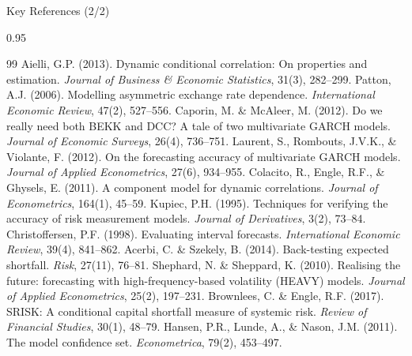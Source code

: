 \documentclass[9pt, aspectratio=169, t]{beamer}
\begin{document}
\begin{frame}{Key References (2/2)}
    \begin{cminipage}{0.95\textwidth}
    \vspace{-3mm}
    {\tiny
    \begin{thebibliography}{99}\setlength{\itemsep}{0pt}
         Aielli, G.P. (2013). Dynamic conditional correlation: On properties and estimation. \textit{Journal of Business \& Economic Statistics}, 31(3), 282--299.
         Patton, A.J. (2006). Modelling asymmetric exchange rate dependence. \textit{International Economic Review}, 47(2), 527--556.
         Caporin, M. \& McAleer, M. (2012). Do we really need both BEKK and DCC? A tale of two multivariate GARCH models. \textit{Journal of Economic Surveys}, 26(4), 736--751.
         Laurent, S., Rombouts, J.V.K., \& Violante, F. (2012). On the forecasting accuracy of multivariate GARCH models. \textit{Journal of Applied Econometrics}, 27(6), 934--955.
         Colacito, R., Engle, R.F., \& Ghysels, E. (2011). A component model for dynamic correlations. \textit{Journal of Econometrics}, 164(1), 45--59.
         Kupiec, P.H. (1995). Techniques for verifying the accuracy of risk measurement models. \textit{Journal of Derivatives}, 3(2), 73--84.
         Christoffersen, P.F. (1998). Evaluating interval forecasts. \textit{International Economic Review}, 39(4), 841--862.
         Acerbi, C. \& Szekely, B. (2014). Back-testing expected shortfall. \textit{Risk}, 27(11), 76--81.
         Shephard, N. \& Sheppard, K. (2010). Realising the future: forecasting with high-frequency-based volatility (HEAVY) models. \textit{Journal of Applied Econometrics}, 25(2), 197--231.
         Brownlees, C. \& Engle, R.F. (2017). SRISK: A conditional capital shortfall measure of systemic risk. \textit{Review of Financial Studies}, 30(1), 48--79.
         Hansen, P.R., Lunde, A., \& Nason, J.M. (2011). The model confidence set. \textit{Econometrica}, 79(2), 453--497.
    \end{thebibliography}
    }
    \end{cminipage}
\end{frame}
\end{document}
